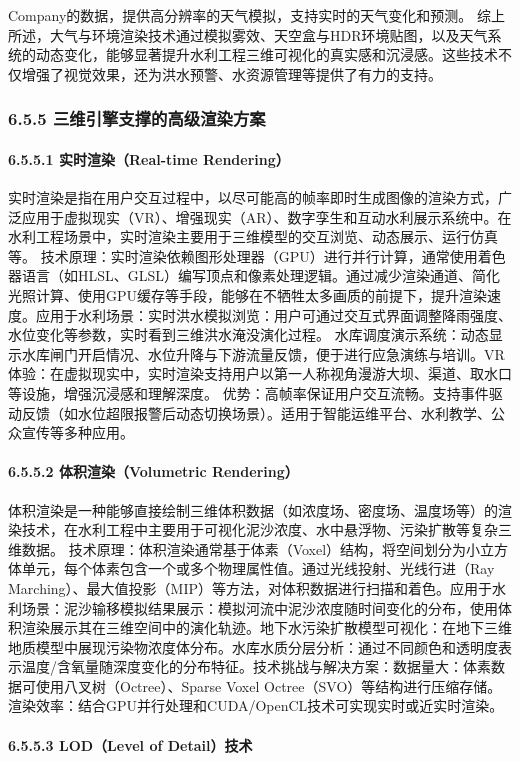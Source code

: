 Company的数据，提供高分辨率的天气模拟，支持实时的天气变化和预测。 综上所述，大气与环境渲染技术通过模拟雾效、天空盒与HDR环境贴图，以及天气系统的动态变化，能够显著提升水利工程三维可视化的真实感和沉浸感。这些技术不仅增强了视觉效果，还为洪水预警、水资源管理等提供了有力的支持。 \subsubsection{6.5.5 三维引擎支撑的高级渲染方案}\label{ux4e09ux7ef4ux5f15ux64ceux652fux6491ux7684ux9ad8ux7ea7ux6e32ux67d3ux65b9ux6848} \paragraph{6.5.5.1 实时渲染（Real-time Rendering）}\label{ux5b9eux65f6ux6e32ux67d3real-time-rendering} 实时渲染是指在用户交互过程中，以尽可能高的帧率即时生成图像的渲染方式，广泛应用于虚拟现实（VR）、增强现实（AR）、数字孪生和互动水利展示系统中。在水利工程场景中，实时渲染主要用于三维模型的交互浏览、动态展示、运行仿真等。 技术原理：实时渲染依赖图形处理器（GPU）进行并行计算，通常使用着色器语言（如HLSL、GLSL）编写顶点和像素处理逻辑。通过减少渲染通道、简化光照计算、使用GPU缓存等手段，能够在不牺牲太多画质的前提下，提升渲染速度。应用于水利场景：实时洪水模拟浏览：用户可通过交互式界面调整降雨强度、水位变化等参数，实时看到三维洪水淹没演化过程。 水库调度演示系统：动态显示水库闸门开启情况、水位升降与下游流量反馈，便于进行应急演练与培训。VR体验：在虚拟现实中，实时渲染支持用户以第一人称视角漫游大坝、渠道、取水口等设施，增强沉浸感和理解深度。 优势：高帧率保证用户交互流畅。支持事件驱动反馈（如水位超限报警后动态切换场景）。适用于智能运维平台、水利教学、公众宣传等多种应用。 \paragraph{6.5.5.2 体积渲染（Volumetric Rendering）}\label{ux4f53ux79efux6e32ux67d3volumetric-rendering} 体积渲染是一种能够直接绘制三维体积数据（如浓度场、密度场、温度场等）的渲染技术，在水利工程中主要用于可视化泥沙浓度、水中悬浮物、污染扩散等复杂三维数据。 技术原理：体积渲染通常基于体素（Voxel）结构，将空间划分为小立方体单元，每个体素包含一个或多个物理属性值。通过光线投射、光线行进（Ray Marching）、最大值投影（MIP）等方法，对体积数据进行扫描和着色。应用于水利场景：泥沙输移模拟结果展示：模拟河流中泥沙浓度随时间变化的分布，使用体积渲染展示其在三维空间中的演化轨迹。地下水污染扩散模型可视化：在地下三维地质模型中展现污染物浓度体分布。水库水质分层分析：通过不同颜色和透明度表示温度/含氧量随深度变化的分布特征。技术挑战与解决方案：数据量大：体素数据可使用八叉树（Octree）、Sparse Voxel Octree（SVO）等结构进行压缩存储。渲染效率：结合GPU并行处理和CUDA/OpenCL技术可实现实时或近实时渲染。 \paragraph{6.5.5.3 LOD（Level of Detail）技术}\label{lodlevel-of-detailux6280ux672f} 